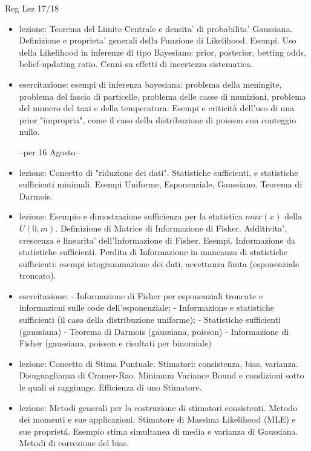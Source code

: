 \begin{frame}[allowframebreaks]{Reg Lez 17/18}
\begin{itemize}
\item lezione: Teorema del Limite Centrale e densita' di probabilita' Gaussiana. Definizione e proprieta' generali della Funzione di Likelihood. Esempi. Uso della Likelihood in inferenze di tipo Bayesiano: prior, posterior, betting odds, belief-updating ratio. Cenni su effetti di incertezza sistematica.

\item esercitazione: esempi di inferenza bayesiana: problema della meningite, problema del fascio di particelle, problema delle casse di munizioni, problema del numero del taxi e della temperatura. Esempi e criticità dell'uso di una prior "impropria", come il caso della distribuzione di poisson con conteggio nullo.

--per 16 Agosto--
\hypertarget{datareduction}{}

\item lezione: Concetto di "riduzione dei dati". Statistiche sufficienti, e statistiche sufficienti minimali. Esempi Uniforme, Esponenziale, Gaussiano. Teorema di Darmois.
    
\item lezione: Esempio e dimostrazione sufficienza per la statistica $max(x)$ della $U(0,m)$. Definizione di Matrice di Informazione di Fisher. Additivita', crescenza e linearita' dell'Informazione di Fisher. Esempi. Informazione da statistiche sufficienti. Perdita di Informazione in mancanza di statistiche sufficienti: esempi istogrammazione dei dati, accettanza finita (esponenziale troncato).

\item esercitazione: - Informazione di Fisher per esponenziali troncate e informazioni sulle code dell’esponenziale; - Informazione e statistiche sufficienti (il caso della distribuzione uniforme); - Statistiche sufficienti (gaussiana) - Teorema di Darmois (gaussiana, poisson) - Informazione di Fisher (gaussiana, poisson e risultati per binomiale)

\item lezione: Concetto di Stima Puntuale. Stimatori: consistenza, bias, varianza. Disuguaglianza di Cramer-Rao. Minimum Variance Bound e condizioni sotto le quali si raggiunge. Efficienza di uno Stimatore.

\item lezione: Metodi generali per la costruzione di stimatori consistenti. Metodo dei momenti e sue applicazioni. Stimatore di Massima Likelihood (MLE) e sue propriet\'a. Esempio stima simultanea di media e varianza di Gaussiana. Metodi di correzione del bias.


\end{itemize}
\end{frame}
